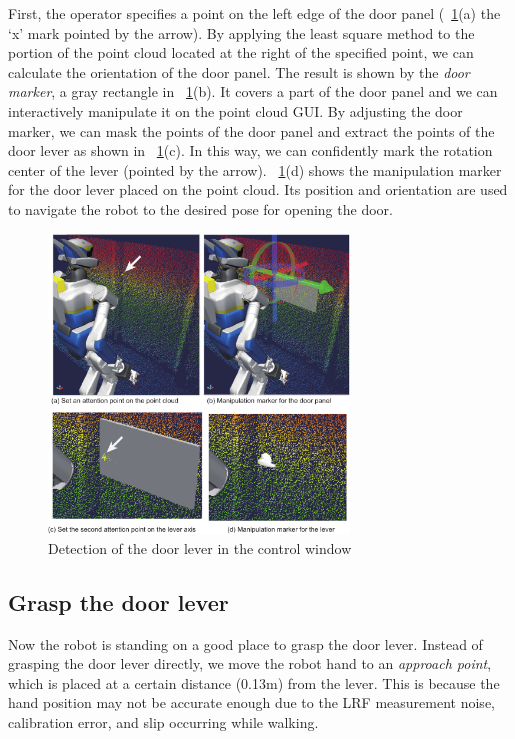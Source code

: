 First, the operator specifies a point on the left edge of the door panel
(\figurename~\ref{fig:door_manip_markers}(a) the `x' mark pointed by the arrow).
By applying the least square method to the portion of the point cloud located at the right of
the specified point, we can calculate the orientation of the door panel.
The result is shown by the {\it door marker}, a gray rectangle in
\figurename~\ref{fig:door_manip_markers}(b).
It covers a part of the door panel and we can interactively manipulate it on the point cloud GUI.
By adjusting the door marker, we can mask the points of the door panel and extract the points of
the door lever as shown in \figurename~\ref{fig:door_manip_markers}(c).
In this way, we can confidently mark the rotation center of the lever (pointed by the arrow).
\figurename~\ref{fig:door_manip_markers}(d) shows the manipulation marker for the door lever
placed on the point cloud.
Its position and orientation are used to navigate the robot to the desired pose for opening
the door.

\begin{figure}[t]
  \centering
  \includegraphics[width = 8cm]{img/door_manipulation_markers}
  \caption{Detection of the door lever in the control window}
  \label{fig:door_manip_markers}
\end{figure}

\subsection{Grasp the door lever}
%
Now the robot is standing on a good place to grasp the door lever.
Instead of grasping the door lever directly, we move the robot hand to an {\it approach point},
which is placed at a certain distance (0.13m) from the lever. 
This is because the hand position may not be accurate enough due to the LRF measurement noise,
calibration error, and slip occurring while walking.

